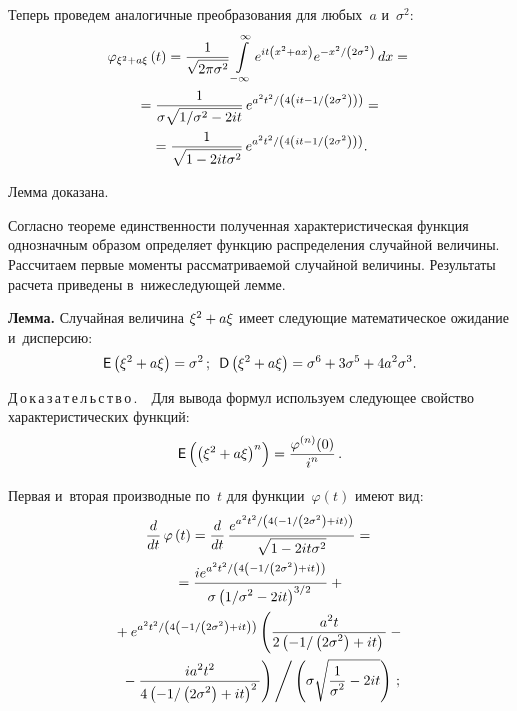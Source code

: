\begin{multicols}{2}
Теперь проведем аналогичные преобразования для любых~$a$ и~$\sigma^{2}$:
   \begin{multline*}
    \varphi_{\xi^{2} + a\xi} \left(t \right) = 
    \displaystyle\frac{\displaystyle 1\mathstrut}{\displaystyle \sqrt{2\pi\sigma^2}\mathstrut}\int\limits_{-\infty}^{\infty}
    e^{it\left( x^{2} + a x \right) }
    e^{-{x^{2}}/\left({2\sigma^{2}}\right)}\, dx = {}\\
    {}=
    \displaystyle\frac{\displaystyle 1\mathstrut}{\displaystyle \sigma\sqrt{{1}/{\sigma^{2}}-2it}\mathstrut}\,
    e^{{a^{2}t^{2}}/\left({4\left(it - {1}/\left({2\sigma^{2}}\right)\right) }\right)} = {}\\
    {}=
    \displaystyle\frac{\displaystyle 1\mathstrut}{\displaystyle \sqrt{1-2it\sigma^2}\mathstrut}\,e^{{a^{2}t^{2}}/
    \left({4\left(it - {1}/\left({2\sigma^{2}}\right)\right) }\right)}.
\end{multline*}
    
    Лемма доказана.
    
    \smallskip
    
Согласно теореме единственности полученная характеристическая функция 
однозначным образом определяет функцию распределения случайной величины. 
Рассчитаем первые моменты рассматриваемой случайной величины. Результаты 
расчета приведены в~нижеследующей лемме.

\smallskip
    
\noindent
\textbf{Лемма.}
    Случайная величина $\xi^{2} \hm+ a\xi$ имеет сле\-ду\-ющие 
    математическое ожидание и~дисперсию:
$$
    {\sf E}\left( \xi^{2} + a\xi \right) = \sigma^2\,; \enskip 
    {\sf D}\left( \xi^{2} + a\xi \right) = \sigma^6 + 3\sigma^5+4 a^2 \sigma^3.
$$
    
\noindent
Д\,о\,к\,а\,з\,а\,т\,е\,л\,ь\,с\,т\,в\,о\,.\ \
Для вывода формул используем следующее свойство характеристических функций:
\begin{equation*}
{\sf E}\left(\left( \xi^{2} + a\xi\right)^n \right)  =
\displaystyle\frac{\displaystyle \varphi^{(n)}(0)\mathstrut}{\displaystyle i^n \mathstrut}\,.
\end{equation*}

Первая и~вторая производные по~$t$ для функции~$\varphi(t)$ имеют вид:
\begin{multline*} 
    \displaystyle\frac{\displaystyle d\mathstrut}{\displaystyle dt\mathstrut}\,\varphi\left( t\right) =
    \displaystyle\frac{\displaystyle d\mathstrut}{\displaystyle dt\mathstrut}\,\displaystyle\frac{\displaystyle e^{{a^2 t^2}/\left({4(-{1}/\left({2 \sigma^2}\right)+i t)}\right)}\mathstrut}{\displaystyle \sqrt{1-2 i t\sigma^2}\mathstrut} = {}\\
    {}=
    \displaystyle\frac{\displaystyle i e^{{a^2 t^2}/\left({4 \left(-{1}/\left({2 \sigma^2}\right)+i t\right)}\right)}\mathstrut}{\displaystyle \sigma \left({1}/{\sigma^2}-2 i t\right)^{3/2}\mathstrut}+{}
\\
        {}+
       e^{{a^2t^2}/\left({4 \left(-{1}/\left({2 \sigma^2}\right)+i t\right)}\right)} 
       \left(
    \displaystyle\frac{\displaystyle a^2 t\mathstrut}{\displaystyle 2 \left(-{1}/\left({2 \sigma^2}\right)+i t\right)\mathstrut}-{}\right.\\
\left.    {}-
   \displaystyle\frac{\displaystyle i a^2 t^2\mathstrut}{\displaystyle 4 \left(-{1}/\left(2 \sigma^2\right)+i t\right)^2\mathstrut}
  \right)
  \Bigg / 
    \left(\sigma\sqrt{\displaystyle\frac{\displaystyle 1\mathstrut}{\displaystyle \sigma^2\mathstrut}-2 it}\right)\,;
\end{multline*}


\end{multicols}
